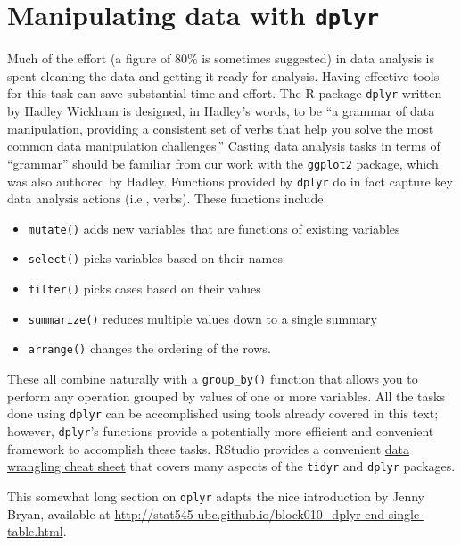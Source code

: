 \documentclass[12pt,oneside]{book}\usepackage[]{graphicx}\usepackage[]{color}
\begin{document}
\section{Manipulating data with \texttt{dplyr}}\label{sec:dplyr}
Much of the effort (a figure of 80\% is sometimes suggested) in data analysis is spent cleaning the data and getting it ready for analysis. Having effective tools for this task can save substantial time and effort. The R package \verb+dplyr+ written by Hadley Wickham is designed, in Hadley's words, to be ``a grammar of data manipulation, providing a consistent set of verbs that help you solve the most common data manipulation challenges.'' Casting data analysis tasks in terms of ``grammar'' should be familiar from our work with the \verb+ggplot2+ package, which was also authored by Hadley. Functions provided by \verb+dplyr+ do in fact capture key data analysis actions (i.e., verbs). These functions include
\begin{itemize}
\item[] \texttt{mutate()} adds new variables that are functions of existing variables
\item[] \texttt{select()} picks variables based on their names
\item[] \texttt{filter()} picks cases based on their values
\item[] \texttt{summarize()} reduces multiple values down to a single summary
\item[] \texttt{arrange()} changes the ordering of the rows.
\end{itemize}
These all combine naturally with a \verb+group_by()+ function that allows you to perform any operation grouped by values of one or more variables. All the tasks done using \verb+dplyr+ can be accomplished using tools already covered in this text; however, \verb+dplyr+'s functions provide a potentially more efficient and convenient framework to accomplish these tasks. RStudio provides a convenient \href{https://www.rstudio.com/wp-content/uploads/2015/02/data-wrangling-cheatsheet.pdf}{data wrangling cheat sheet} that covers many aspects of the \verb+tidyr+ and \verb+dplyr+ packages. 

This somewhat long section on \verb+dplyr+ adapts the nice introduction by Jenny Bryan, available at \url{http://stat545-ubc.github.io/block010_dplyr-end-single-table.html}. 
\end{document}
